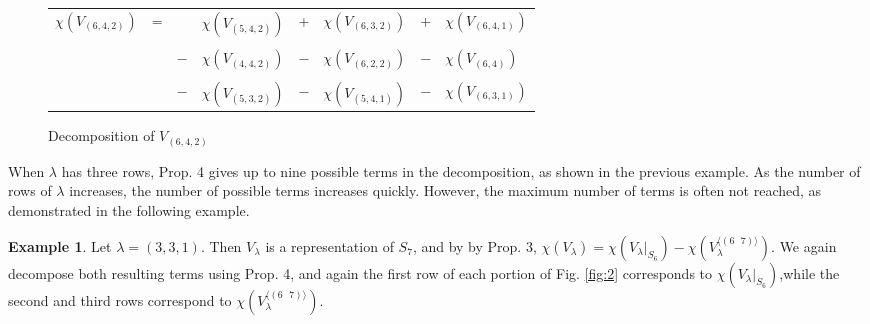\documentclass[12pt]{amsart}
\theoremstyle{definition}
\newtheorem{ex}{Example}
\begin{document}
\begin{figure}
\begin{center}
\begin{tabular}{lcclclcl}
$\chi(V_{(6,4,2)})$& = && $\chi(V_{(5,4,2)})$ & + &$\chi(V_{(6,3,2)})$ & + & $\chi(V_{(6,4,1)})$ \\ &&&&&&& \\
&& $-$ & $\chi(V_{(4,4,2)})$ & $-$ & $\chi(V_{(6,2,2)})$ & $-$ & $\chi(V_{(6,4)})$ \\ &&&&&&& \\
&& $-$ & $\chi(V_{(5,3,2)})$ & $-$ & $\chi(V_{(5,4,1)})$ & $-$ & $\chi(V_{(6,3,1)})$ \\
\end{tabular}
\end{center}
\caption{Decomposition of $V_{(6, 4, 2)}$}
\label{fig:1}       %
\end{figure}

When $\lambda$ has three rows, Prop. 4 gives up to nine possible terms in the decomposition, as shown in the previous example. As the number of rows of $\lambda$ increases, the number of possible terms increases quickly. However, the maximum number of terms is often not reached, as demonstrated in the following example.

\begin{ex}
Let $\lambda = (3,3,1)$. Then $V_{\lambda}$ is a representation of $S_{7}$, and by by Prop. 3, $\chi(V_{\lambda}) = \chi(V_{\lambda}|_{S_{6}}) - \chi(V_{\lambda}^{\langle (6 \text{ } 7) \rangle})$. We again decompose both resulting terms using Prop. 4, and again the first row of each portion of Fig. \ref{fig:2} corresponds to $\chi(V_{\lambda}|_{S_{6}})$,while the second and third rows correspond to $\chi(V_{\lambda}^{\langle (6 \text{ } 7) \rangle})$.

\end{ex}
\end{document}
